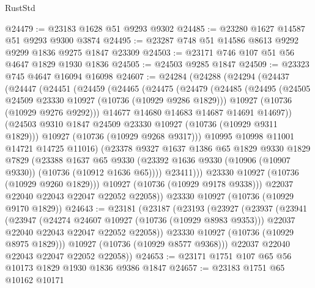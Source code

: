 \begin{lexlean}{RustStd}
\begin{coremodule}
@24479 := @23183 @1628 @51 @9293 @9302
@24485 := @23280 @1627 @14587 @51 @9293 @9300 @3874
@24495 := @23287 @748 @51 @14586 @8613 @9292 @9299 @1836 @9275 @1847 @23309
@24503 := @23171 @746 @107 @51 @56 @4647 @1829 @1930 @1836
@24505 := @24503 @9285 @1847
@24509 := @23323 @745 @4647 @16094 @16098
@24607 := @24284
    (@24288
      (@24294
        (@24437
          (@24447
            (@24451
              (@24459
                (@24465
                  (@24475
                    (@24479
                      (@24485
                        (@24495
                          (@24505 @24509 @23330 @10927 (@10736 (@10929 @9286 @1829)))
                          @10927
                          (@10736 (@10929 @9276 @9292)))
                        @14677
                        @14680
                        @14683
                        @14687
                        @14691
                        @14697))
                    (@24503 @9310 @1847 @24509 @23330 @10927 (@10736 (@10929 @9311 @1829)))
                    @10927
                    (@10736 (@10929 @9268 @9317)))
                  @10995
                  @10998
                  @11001
                  @14721
                  @14725
                  @11016)
                (@23378
                  @9327
                  @1637
                  @1386
                  @65
                  @1829
                  @9330
                  @1829
                  @7829
                  (@23388
                    @1637
                    @65
                    @9330
                    (@23392 @1636 @9330 (@10906 (@10907 @9330)) (@10736 (@10912 @1636 @65))))
                  @23411)))
            @23330
            @10927
            (@10736 (@10929 @9260 @1829)))
          @10927
          (@10736 (@10929 @9178 @9338)))
        @22037
        @22040
        @22043
        @22047
        @22052
        @22058))
    @23330
    @10927
    (@10736 (@10929 @9170 @1829))
@24643 := @23181
    (@23187
      (@23193
        (@23927
          (@23937
            (@23941
              (@23947
                (@24274 @24607 @10927 (@10736 (@10929 @8983 @9353)))
                @22037
                @22040
                @22043
                @22047
                @22052
                @22058))
            @23330
            @10927
            (@10736 (@10929 @8975 @1829)))
          @10927
          (@10736 (@10929 @8577 @9368)))
        @22037
        @22040
        @22043
        @22047
        @22052
        @22058))
@24653 := @23171 @1751 @107 @65 @56 @10173 @1829 @1930 @1836 @9386 @1847
@24657 := @23183 @1751 @65 @10162 @10171

\end{coremodule}
\end{lexlean}
